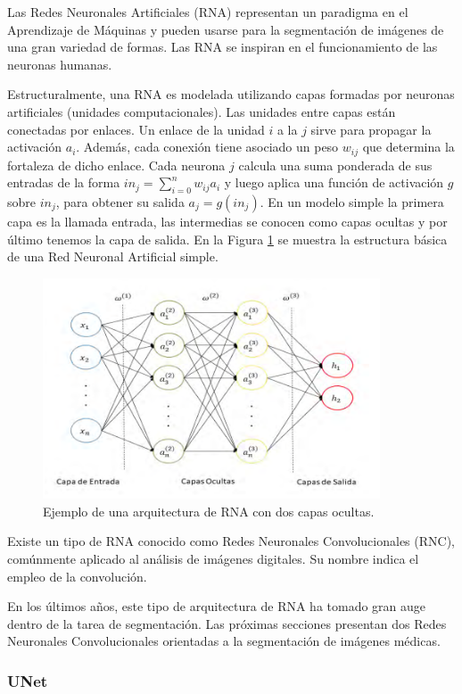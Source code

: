 Las Redes Neuronales Artificiales (RNA) representan un paradigma en el Aprendizaje de Máquinas y pueden usarse para la segmentación de imágenes de una gran variedad de formas. Las RNA se inspiran en el funcionamiento de las neuronas humanas.

Estructuralmente, una RNA es modelada utilizando capas formadas por neuronas artificiales (unidades computacionales). Las unidades entre capas están conectadas por enlaces. Un enlace de la unidad $i$ a la $j$ sirve para propagar la activación $a_i$. Además, cada conexión tiene asociado un peso $w_{ij}$ que determina la fortaleza de dicho enlace. Cada neurona $j$ calcula una suma ponderada de sus entradas de la forma $in_j = \displaystyle\sum_{i = 0}^{n} w_{ij}a_i$ y luego aplica una función de activación $g$ sobre $in_j$, para obtener su salida $a_j = g(in_j)$. En un modelo simple la primera capa es la llamada entrada, las intermedias se conocen como capas ocultas y por último tenemos la capa de salida. En la Figura \ref{fig:rna} se muestra la estructura básica de una Red Neuronal Artificial simple.

\begin{figure}[ht]
	\centering
	\includegraphics[width=10cm]{./Graphics/rna.png}
	\caption{Ejemplo de una arquitectura de RNA con dos capas ocultas.}
	\label{fig:rna}
\end{figure}

Existe un tipo de RNA conocido como Redes Neuronales Convolucionales (RNC), comúnmente aplicado al análisis de imágenes digitales. Su nombre indica el empleo de la convolución.

En los últimos años, este tipo de arquitectura de RNA ha tomado gran auge dentro de la tarea de segmentación. Las próximas secciones presentan dos Redes Neuronales Convolucionales orientadas a la segmentación de imágenes médicas.

\subsubsection{UNet}


